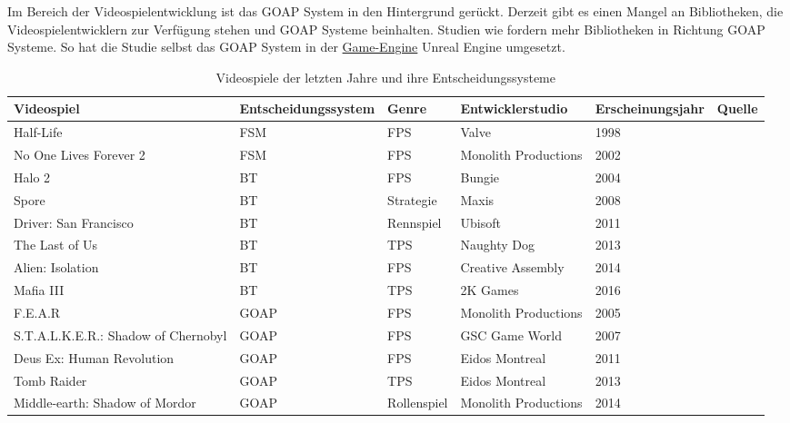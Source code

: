 Im Bereich der Videospielentwicklung ist das GOAP System in den Hintergrund ger\"{u}ckt. Derzeit gibt es einen Mangel an Bibliotheken, die Videospielentwicklern zur Verf\"{u}gung stehen und GOAP Systeme beinhalten. Studien wie \autocite{Romero2020DevelopingAA, sielicki2018adaptation} fordern mehr Bibliotheken in Richtung GOAP Systeme. So hat die Studie selbst das GOAP System in der \hyperref[chap:game engines]{Game-Engine} Unreal Engine umgesetzt.


\begin{sidewaystable}[h]
	\caption{Videospiele der letzten Jahre und ihre Entscheidungssysteme}
  \label{tab:videospiele}
  \renewcommand{\arraystretch}{1.2}
  \centering
  \small
    \begin{tabularx}{0.95\textwidth}{l l x x x x}
			\toprule
      \textbf{Videospiel} & \textbf{Entscheidungssystem} & \textbf{Genre} & \textbf{Entwicklerstudio} & \textbf{Erscheinungsjahr} & \textbf{Quelle} \\
			\midrule
			Half-Life & FSM & FPS & Valve & 1998 & \autocite{halflife} \\
			No One Lives Forever 2 & FSM & FPS & Monolith Productions & 2002 & \autocite{fear} \\
			Halo 2 & BT & FPS & Bungie & 2004 & \autocite{aiag} \\
			Spore & BT & Strategie & Maxis & 2008 & \autocite{spore} \\
			Driver: San Francisco & BT & Rennspiel & Ubisoft & 2011 & \autocite{Ocio2021} \\
			The Last of Us & BT & TPS & Naughty Dog & 2013 & \autocite{panwar2022npcaiuscase} \\
			Alien: Isolation & BT & FPS & Creative Assembly & 2014 & \autocite{vsvelch2020should} \\
			Mafia III & BT & TPS & 2K Games & 2016 & \autocite{holba2021open} \\
			F.E.A.R & GOAP & FPS & Monolith Productions & 2005 & \autocite{fear} \\
      S.T.A.L.K.E.R.: Shadow of Chernobyl & GOAP & FPS & GSC Game World & 2007 & \autocite{sielicki2018adaptation} \\
      Deus Ex: Human Revolution & GOAP & FPS & Eidos Montreal & 2011 & \autocite{sielicki2018adaptation} \\
			Tomb Raider & GOAP & TPS & Eidos Montreal & 2013 & \autocite{goap_gdc} \\
      Middle-earth: Shadow of Mordor & GOAP & Rollenspiel & Monolith Productions & 2014 & \autocite{goap_gdc} \\
      \bottomrule
    \end{tabularx}
\end{sidewaystable}
